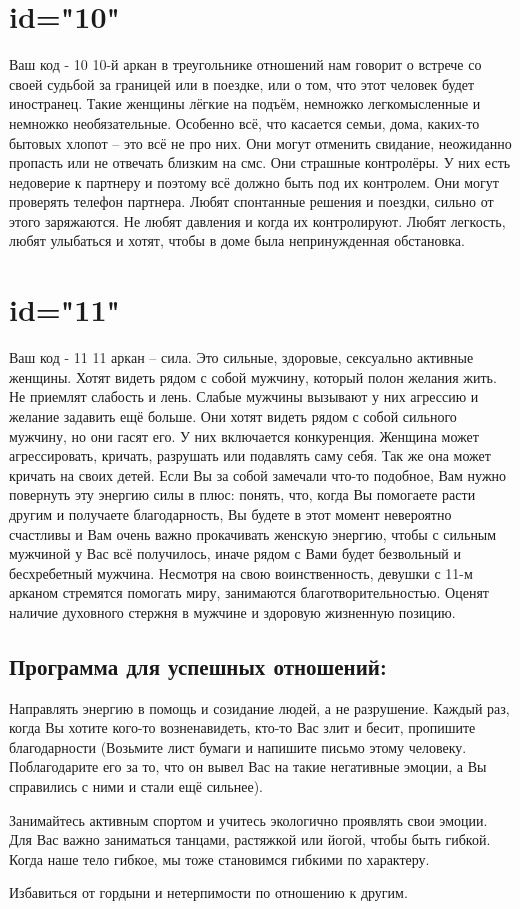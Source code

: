 \section{id="10"}{Ваш код - 10}
10-й аркан в треугольнике отношений нам говорит о встрече со своей 
судьбой за границей или в поездке, или о том, что этот человек будет 
иностранец. Такие женщины лёгкие на подъём, немножко легкомысленные 
и немножко необязательные. Особенно всё, что касается семьи, дома, 
каких-то бытовых хлопот – это всё не про них. Они могут отменить 
свидание, неожиданно пропасть или не отвечать близким на смс. Они 
страшные контролёры. У них есть недоверие к партнеру и поэтому всё 
должно быть под их контролем. Они могут проверять телефон партнера. 
Любят спонтанные решения и поездки, сильно от этого заряжаются. Не 
любят давления и когда их контролируют. Любят легкость, любят улыбаться 
и хотят, чтобы в доме была непринужденная обстановка.
\endsubsection
\endsection

\section{id="11"}{Ваш код - 11}
11 аркан – сила. Это сильные, здоровые, сексуально активные женщины. 
Хотят видеть рядом с собой мужчину, который полон желания жить. Не 
приемлят слабость и лень. Слабые мужчины вызывают у них агрессию и 
желание задавить ещё больше. Они хотят видеть рядом с собой сильного 
мужчину, но они гасят его. У них включается конкуренция. Женщина 
может агрессировать, кричать, разрушать или подавлять саму себя. Так 
же она может кричать на своих детей. Если Вы за собой замечали что-то 
подобное, Вам нужно повернуть эту энергию силы в плюс: понять, что, 
когда Вы помогаете расти другим и получаете благодарность, Вы будете 
в этот момент невероятно счастливы и Вам очень важно прокачивать 
женскую энергию, чтобы с сильным мужчиной у Вас всё получилось, иначе 
рядом с Вами будет безвольный и бесхребетный мужчина. Несмотря на 
свою воинственность, девушки с 11-м арканом стремятся помогать миру, 
занимаются благотворительностью. Оценят наличие духовного стержня в 
мужчине и здоровую жизненную позицию.
\subsection{Программа для успешных отношений:}
\item Направлять энергию в помощь и созидание людей, а не разрушение. 
Каждый раз, когда Вы хотите кого-то возненавидеть, кто-то Вас злит 
и бесит, пропишите благодарности (Возьмите лист бумаги и напишите 
письмо этому человеку. Поблагодарите его за то, что он вывел Вас на 
такие негативные эмоции, а Вы справились с ними и стали ещё сильнее).
\item Занимайтесь активным спортом и учитесь экологично проявлять 
свои эмоции. Для Вас важно заниматься танцами, растяжкой или йогой, 
чтобы быть гибкой. Когда наше тело гибкое, мы тоже становимся гибкими 
по характеру.
\item Избавиться от гордыни и нетерпимости по отношению к другим.
\endsubsection
\endsection

